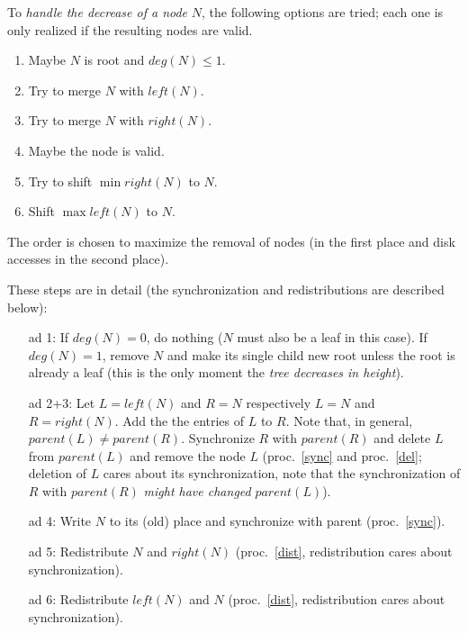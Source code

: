 \documentclass{vldb}
\begin{document}
\begin{proc} \label{dec}
To {\em handle the decrease of a node} $N$, the following options are tried;
each one is only realized if the resulting nodes are valid.
\begin{enumerate}
\item Maybe $N$ is root and \mbox{$deg(N) \leq 1$}.
\item Try to merge $N$ with $left(N)$.
\item Try to merge $N$ with $right(N)$.
\item Maybe the node is valid.
\item Try to shift \mbox{$\min right(N)$} to $N$.
\item Shift \mbox{$\max left(N)$} to $N$.
\end{enumerate}
The order is chosen to maximize the removal of nodes (in the first place and
disk accesses in the second place).

These steps are in detail (the synchronization and redistributions are 
described below):
\begin{itemize}
\item[ad 1:] If \mbox{$deg(N) = 0$}, do nothing ($N$ must also be a leaf in
    this case).
    If \mbox{$deg(N) = 1$}, remove $N$ and make its single child new root
    unless the root is already a leaf (this is the only moment the 
    {\em tree decreases in height}).
\item[ad 2+3:] Let \mbox{$L = left(N)$} and \mbox{$R = N$} respectively
    \mbox{$L = N$} and $R = right(N)$.
    Add the the entries of $L$ to $R$.
    Note that, in general, \mbox{$parent(L) \neq parent(R)$}.
    Synchronize $R$ with $parent(R)$ and delete $L$ from $parent(L)$
    and remove the node $L$ 
    (proc.~\ref{sync} and proc.~\ref{del}; deletion of $L$ cares about its
    synchronization, note that the synchronization of $R$ with $parent(R)$
    {\em might have changed} $parent(L)$).
\item[ad 4:] Write $N$ to its (old) place and synchronize with parent
    (proc.~\ref{sync}).
\item[ad 5:] Redistribute $N$ and $right(N)$ (proc.~\ref{dist},
    redistribution cares about synchronization).
\item[ad 6:] Redistribute $left(N)$ and $N$ (proc.~\ref{dist},
    redistribution cares about synchronization).
\end{itemize}
\end{proc}
\end{document}
